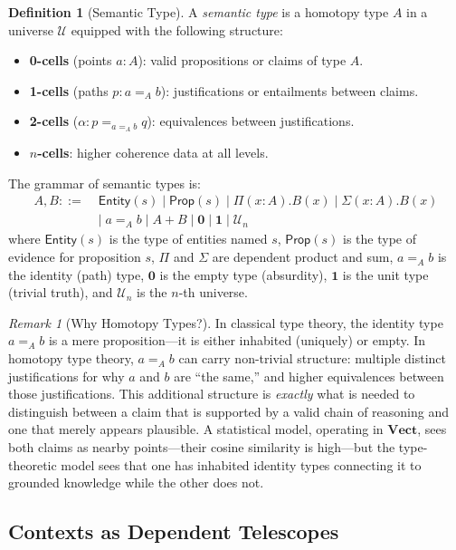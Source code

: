 \documentclass[11pt,a4paper]{article}
\theoremstyle{plain}
\theoremstyle{definition}
\newtheorem{definition}[theorem]{Definition}
\theoremstyle{remark}
\newtheorem{remark}[theorem]{Remark}
\newcommand{\Vect}{\mathbf{Vect}}
\begin{document}
\begin{definition}[Semantic Type]\label{def:semtype}
A \emph{semantic type} is a homotopy type $A$ in a universe $\mathcal{U}$ equipped with the following structure:
\begin{itemize}[nosep]
  \item \textbf{0-cells} (points $a : A$): valid propositions or claims of type $A$.
  \item \textbf{1-cells} (paths $p : a =_A b$): justifications or entailments between claims.
  \item \textbf{2-cells} ($\alpha : p =_{a =_A b} q$): equivalences between justifications.
  \item \textbf{$n$-cells}: higher coherence data at all levels.
\end{itemize}
The grammar of semantic types is:
\begin{align}
  A, B ::=\;& \mathsf{Entity}(s) \mid \mathsf{Prop}(s) \mid \Pi(x : A). B(x) \mid \Sigma(x:A).B(x) \nonumber\\
  &\mid\; a =_A b \mid A + B \mid \mathbf{0} \mid \mathbf{1} \mid \mathcal{U}_n \label{eq:semtype-grammar}
\end{align}
where $\mathsf{Entity}(s)$ is the type of entities named $s$, $\mathsf{Prop}(s)$ is the type of evidence for proposition $s$, $\Pi$ and $\Sigma$ are dependent product and sum, $a =_A b$ is the identity (path) type, $\mathbf{0}$ is the empty type (absurdity), $\mathbf{1}$ is the unit type (trivial truth), and $\mathcal{U}_n$ is the $n$-th universe.
\end{definition}

\begin{remark}[Why Homotopy Types?]\label{rem:why-homotopy}
In classical type theory, the identity type $a =_A b$ is a mere proposition---it is either inhabited (uniquely) or empty.
In homotopy type theory, $a =_A b$ can carry non-trivial structure: multiple distinct justifications for why $a$ and $b$ are ``the same,'' and higher equivalences between those justifications.
This additional structure is \emph{exactly} what is needed to distinguish between a claim that is supported by a valid chain of reasoning and one that merely appears plausible.
A statistical model, operating in $\Vect$, sees both claims as nearby points---their cosine similarity is high---but the type-theoretic model sees that one has inhabited identity types connecting it to grounded knowledge while the other does not.
\end{remark}

\subsection{Contexts as Dependent Telescopes}
\end{document}

